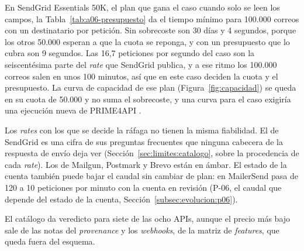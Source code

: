 En SendGrid Essentials 50K, el plan que gana el caso cuando solo se leen los campos, la Tabla~\ref{tab:a06-presupuesto} da el tiempo mínimo para 100.000 correos con un destinatario por petición.
Sin sobrecoste son 30 días y 4 segundos, porque los otros 50.000 esperan a que la cuota se reponga, y con un presupuesto que lo cubra son 9 segundos.
Las 16,7 peticiones por segundo del caso son la seiscentésima parte del \textit{rate} que SendGrid publica, y a ese ritmo los 100.000 correos salen en unos 100 minutos, así que en este caso deciden la cuota y el presupuesto.
La curva de capacidad de ese plan (Figura~\ref{fig:capacidad}) se queda en su cuota de 50.000 y no suma el sobrecoste, y una curva para el caso exigiría una ejecución nueva de PRIME4API \citep{prime4apirepo}.

Los \textit{rates} con los que se decide la ráfaga no tienen la misma fiabilidad.
El de SendGrid es una cifra de sus preguntas frecuentes que ninguna cabecera de la respuesta de envío deja ver (Sección~\ref{sec:limites:catalogo}, sobre la procedencia de cada \textit{rate}).
Los de Mailgun, Postmark y Brevo están en ámbar.
El estado de la cuenta también puede bajar el caudal sin cambiar de plan: en MailerSend pasa de 120 a 10 peticiones por minuto con la cuenta en revisión (P-06, el caudal que depende del estado de la cuenta, Sección~\ref{subsec:evolucion:p06}).

El catálogo da veredicto para siete de las ocho APIs, aunque el precio más bajo sale de las notas del \textit{provenance} y los \textit{webhooks}, de la matriz de \textit{features}, que queda fuera del esquema.
